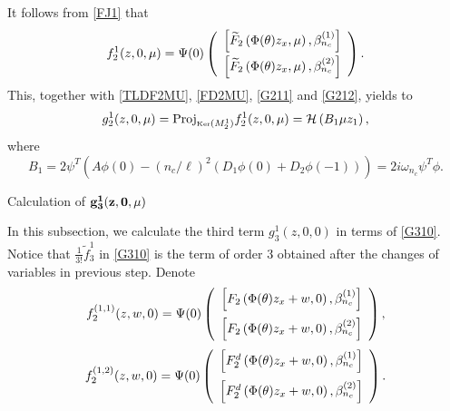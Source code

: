 \documentclass[11pt]{article}
\theoremstyle{definition}
\theoremstyle{remark}
\numberwithin{equation}{section}
\begin{document}
 It follows from  \eqref{FJ1} that
 \begin{equation}
\label{G2F21}
 f^1_2(z, 0,  \mu)=\Psi(0)\left(\begin{array}{c}\left[\widetilde{F}_2\left(\Phi(\theta) z_x,\mu\right),\beta_{n_c}^{(1)}\right]\vspace{0.1cm}\\
\left[\widetilde{F}_2\left(\Phi(\theta) z_x,\mu\right),\beta_{n_c}^{(2)}\right]
\end{array}\right).
\end{equation}
   This,  together with  \eqref{TLDF2MU},  \eqref{FD2MU}, \eqref{G211}  and  \eqref{G212}, yields to
\begin{equation}
\label{G21}
g^1_2(z,0,\mu)=\mbox{Proj}_{\tiny{\mbox{Ker}(M_2^1)}}f_2^1(z,0,\mu)
=
\mathcal{H}\left(B_1 \mu z_1\right),
\end{equation}
 where
$$
B_1=2\psi^{T}\left(A \phi (0) -(n_c/\ell)^2   \left(D_1\phi (0)+D_2\phi(-1)\right)\right)=2i\omega_{n_c}\psi ^{T}\phi. $$
\begin{subsubsection}
{Calculation of $\bf{g_3^1(z,0,\mu)}$}
\end{subsubsection}

In this subsection, we  calculate the
third term $g^1_3(z,0,0)$ in terms of \eqref{G310}. Notice that
  $\frac{1}{3!}\widetilde{f}_3^1$ in \eqref{G310} is the term of order 3
obtained after the changes of variables in previous step.
Denote
\begin{equation}
\label{F211W}
 f^{(1,1)}_2(z, w, 0)=\Psi(0)\left(\begin{array}{c}\left[F_2\left(\Phi(\theta) z_x+w, 0\right),\beta_{n_c}^{(1)}\right]\vspace{0.2cm}\\
\left[F_2\left(\Phi(\theta) z_x+w, 0\right),\beta_{n_c}^{(2)}\right]
\end{array}\right),
\end{equation}
\begin{equation}
\label{F212W}
 f^{(1,2)}_2(z, w, 0)=\Psi(0)\left(\begin{array}{c}\left[F^d_2\left(\Phi(\theta) z_x+w, 0\right),\beta_{n_c}^{(1)}\right]\vspace{0.2cm}\\
\left[F^d_2\left(\Phi(\theta) z_x+w, 0\right),\beta_{n_c}^{(2)}\right]
\end{array}\right).
\end{equation}
\end{document}
